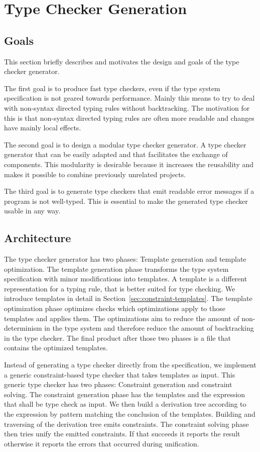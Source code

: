\chapter{Type Checker Generation}
\section{Goals}
This section briefly describes and motivates the design and goals of
the type checker generator.

The first goal is to produce fast type checkers, even if the type
system specification is not geared towards performance. Mainly this
means to try to deal with non-syntax directed typing rules without
backtracking. The motivation for this is that non-syntax directed
typing rules are often more readable and changes have mainly local
effects.

The second goal is to design a modular type checker generator. A type
checker generator that can be easily adapted and that facilitates the
exchange of components. This modularity is desirable because it
increases the reusability and makes it possible to combine previously
unrelated projects.

The third goal is to generate type checkers that emit readable error
messages if a program is not well-typed. This is essential to make the
generated type checker usable in any way.
\section{Architecture}
The type checker generator has two phases: Template generation and
template optimization. The template generation phase transforms the
type system specification with minor modifications into templates. A
template is a different representation for a typing rule, that is
better suited for type checking. We introduce templates in detail in
Section~\ref{sec:constraint-templates}. The template optimization
phase optimizes checks which optimizations apply to those templates
and applies them. The optimizations aim to reduce the amount of
non-determinism in the type system and therefore reduce the amount of
backtracking in the type checker. The final product after those two
phases is a file that contains the optimized templates.

Instead of generating a type checker directly from the specification,
we implement a generic constraint-based type checker that takes
templates as input. This generic type checker has two phases:
Constraint generation and constraint solving. The constraint
generation phase has the templates and the expression that shall be
type check as input. We then build a derivation tree according to the
expression by pattern matching the conclusion of the
templates. Building and traversing of the derivation tree emits
constraints. The constraint solving phase then tries unify the emitted
constraints. If that succeeds it reports the result otherwise it
reports the errors that occurred during unification.

